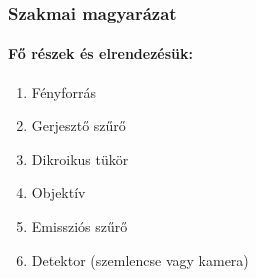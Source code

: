 \documentclass[a4paper,12pt]{article}
\begin{document}
\subsubsection{Szakmai magyarázat}

\paragraph{Fő részek és elrendezésük:} \begin{enumerate} \item Fényforrás \item Gerjesztő szűrő \item Dikroikus tükör \item Objektív \item Emissziós szűrő \item Detektor (szemlencse vagy kamera) \end{enumerate}
\end{document}
